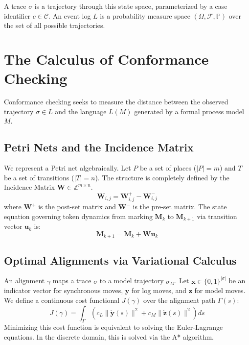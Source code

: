 \documentclass[11pt,a4paper,twocolumn]{article}
\begin{document}
A trace $\sigma$ is a trajectory through this state space, parameterized by a case identifier $c \in \mathcal{C}$. An event log $L$ is a probability measure space $(\Omega, \mathcal{F}, \mathbb{P})$ over the set of all possible trajectories.

\section{The Calculus of Conformance Checking}

Conformance checking seeks to measure the distance between the observed trajectory $\sigma \in L$ and the language $L(M)$ generated by a formal process model $M$.

\subsection{Petri Nets and the Incidence Matrix}
We represent a Petri net algebraically. Let $P$ be a set of places ($|P| = m$) and $T$ be a set of transitions ($|T| = n$). The structure is completely defined by the Incidence Matrix $\mathbf{W} \in \mathbb{Z}^{m \times n}$.
\[
\mathbf{W}_{i,j} = \mathbf{W}^+_{i,j} - \mathbf{W}^-_{i,j}
\]
where $\mathbf{W}^+$ is the post-set matrix and $\mathbf{W}^-$ is the pre-set matrix. The state equation governing token dynamics from marking $\mathbf{M}_k$ to $\mathbf{M}_{k+1}$ via transition vector $\mathbf{u}_k$ is:
\[ \mathbf{M}_{k+1} = \mathbf{M}_k + \mathbf{W} \mathbf{u}_k \]

\subsection{Optimal Alignments via Variational Calculus}
An alignment $\gamma$ maps a trace $\sigma$ to a model trajectory $\sigma_M$. Let $\mathbf{x} \in \{0,1\}^{|\sigma|}$ be an indicator vector for synchronous moves, $\mathbf{y}$ for log moves, and $\mathbf{z}$ for model moves. We define a continuous cost functional $J(\gamma)$ over the alignment path $\Gamma(s)$:
\[ J(\gamma) = \int_{\Gamma} \left( c_L \lVert \mathbf{\dot{y}}(s) \rVert^2 + c_M \lVert \mathbf{\dot{z}}(s) \rVert^2 \right) ds \]
Minimizing this cost function is equivalent to solving the Euler-Lagrange equations. In the discrete domain, this is solved via the A* algorithm.
\end{document}
